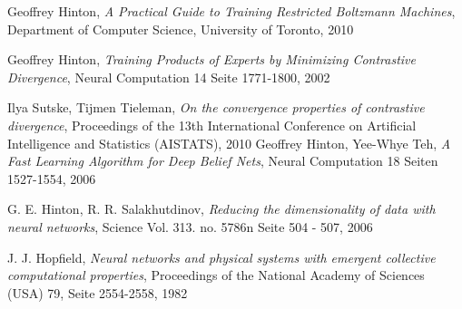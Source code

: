 \documentclass[12pt]{article}
\begin{document}
\begin{thebibliography}{9}

Geoffrey Hinton,
\emph{A Practical Guide to Training Restricted Boltzmann Machines},
Department of Computer Science, 
University of Toronto,
2010

Geoffrey Hinton,
\emph{Training Products of Experts by Minimizing Contrastive Divergence},
Neural Computation 14 Seite 1771-1800,
2002

Ilya Sutske, Tijmen Tieleman,
\emph{On the convergence properties of contrastive divergence},
Proceedings of the 13th International Conference on Artificial Intelligence and Statistics (AISTATS),
2010 
Geoffrey Hinton, Yee-Whye Teh,
\emph{A Fast Learning Algorithm for Deep Belief Nets},
Neural Computation 18 Seiten 1527-1554,
2006

G. E. Hinton, R. R. Salakhutdinov,
\emph{Reducing the dimensionality of data with neural networks},
Science Vol. 313. no. 5786n Seite 504 - 507,
2006

J. J. Hopfield,
 \emph{Neural networks and physical systems with emergent collective computational properties},
Proceedings of the National Academy of Sciences (USA) 79, Seite 2554-2558,
1982
\end{thebibliography}
\end{document}
